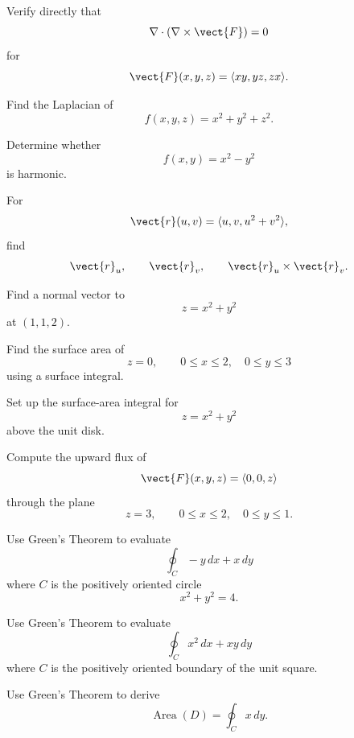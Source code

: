 \begin{exercise}[2]
Verify directly that
\[ \nabla\cdot(\nabla\times\vect{F})=0 \]
for
\[ \vect{F}(x,y,z)=\langle xy,yz,zx\rangle. \]
\end{exercise}

\begin{exercise}[1]
Find the Laplacian of
\[ f(x,y,z)=x^2+y^2+z^2. \]
\end{exercise}

\begin{exercise}[2]
Determine whether
\[ f(x,y)=x^2-y^2 \]
is harmonic.
\end{exercise}

\begin{exercise}[2]
For
\[ \vect{r}(u,v)=\langle u,v,u^2+v^2\rangle, \]
find
\[ \vect{r}_u,\qquad\vect{r}_v,\qquad
\vect{r}_u\times\vect{r}_v. \]
\end{exercise}

\begin{exercise}[2]
Find a normal vector to
\[ z=x^2+y^2 \]
at \((1,1,2)\).
\end{exercise}

\begin{exercise}[2]
Find the surface area of
\[ z=0,\qquad0\leq x\leq2,\quad0\leq y\leq3 \]
using a surface integral.
\end{exercise}

\begin{exercise}[2]
Set up the surface-area integral for
\[ z=x^2+y^2 \]
above the unit disk.
\end{exercise}

\begin{exercise}[2]
Compute the upward flux of
\[ \vect{F}(x,y,z)=\langle0,0,z\rangle \]
through the plane
\[ z=3,\qquad0\leq x\leq2,\quad0\leq y\leq1. \]
\end{exercise}

\begin{exercise}[2]
Use Green's Theorem to evaluate
\[ \oint_C -y\,dx+x\,dy \]
where \(C\) is the positively oriented circle
\[ x^2+y^2=4. \]
\end{exercise}

\begin{exercise}[2]
Use Green's Theorem to evaluate
\[ \oint_C x^2\,dx+xy\,dy \]
where \(C\) is the positively oriented boundary of the unit square.
\end{exercise}

\begin{exercise}[2]
Use Green's Theorem to derive
\[ \operatorname{Area}(D)=\oint_Cx\,dy. \]
\end{exercise}

